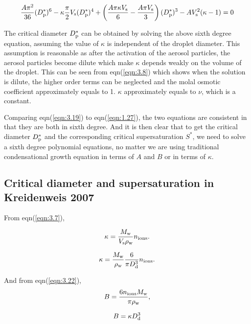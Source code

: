\documentclass[12pt]{article}
\begin{document}
\begin{equation}\label{eqn:3.19}
\frac{A\pi^2}{36}(D_{\rm p}^{*})^{6}-\kappa\frac{\pi}{2}V_{\rm s}(D_{\rm p}^{*})^4+\left(\frac{A\pi \kappa V_{\rm s}}{6}-\frac{A\pi V_{\rm s}}{3}\right)(D_{\rm p}^{*})^{3} -A V_{\rm s}^2(\kappa -1) =0
\end{equation}

The critical diameter $D_{\rm p}^{*}$ can be obtained by solving the above sixth degree equation, assuming the value of $\kappa$ is independent of the droplet diameter. This assumption is reasonable as after the activation of the aerosol particles, the aerosol particles become dilute which make $\kappa$ depends weakly on the volume of the droplet. This can be seen from eqn(\ref{eqn:3.8}) which shows when the solution is dilute, the higher order terms can be neglected and the molal osmotic coefficient approximately equals to 1. $\kappa$  approximately equals to $\nu$, which is a constant.

Comparing eqn(\ref{eqn:3.19}) to eqn(\ref{eqn:1.27}), the two equations are consistent in that they are both in sixth degree. And it is then clear that to get the critical diameter $D_{\rm p}^{*}$ and the corresponding critical supersaturation $S^{*}$, we need to solve a sixth degree polynomial equations, no matter we are using traditional condensational growth equation in terms of $A$ and $B$ or in terms of $\kappa$.  


\subsection{Critical diameter and supersaturation in Kreidenweis 2007}

From eqn(\ref{eqn:3.7}), 

\begin{equation}\label{eqn:3.20}
\kappa= \frac{M_{\rm w}}{V_{\rm s} \rho_{\rm w}}n_{\rm ions}.
\end{equation}

\begin{equation}\label{eqn:3.21}
\kappa= \frac{M_{\rm w}} {\rho_{\rm w}} \frac{6}{\pi D_{\rm d}^{3}} n_{\rm ions}.
\end{equation}

And from eqn(\ref{eqn:3.22}),
\begin{equation}\label{eqn:25}
B=\frac{6 n_{\rm ions} M_{\rm w}}{\pi \rho_{\rm w}},
\end{equation}

\begin{equation}\label{eqn:3.23}
B=\kappa D_{\rm d}^{3}
\end{equation}
\end{document}
